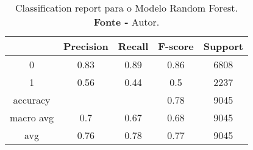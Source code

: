 % 
\begin{table}[H]
    \centering
    \begin{tabular}{@{}ccccc@{}}
    \toprule
     & \textbf{Precision} & \textbf{Recall} &\textbf{F-score} & \textbf{Support} \\ \midrule 
    0 & 0.83 & 0.89 & 0.86 & 6808 \\ 
    1 & 0.56 & 0.44 & 0.5 & 2237 \\ 
    accuracy &  &  & 0.78 & 9045 \\ 
    macro avg & 0.7 & 0.67 & 0.68 & 9045 \\ 
    avg & 0.76 & 0.78 & 0.77 & 9045 \\ \bottomrule
    \end{tabular}
    \caption{Classification report para o Modelo Random Forest. \\ \textbf{Fonte -} Autor.}
    \label{tab: classification-report-Modelo Random Forest}
\end{table}